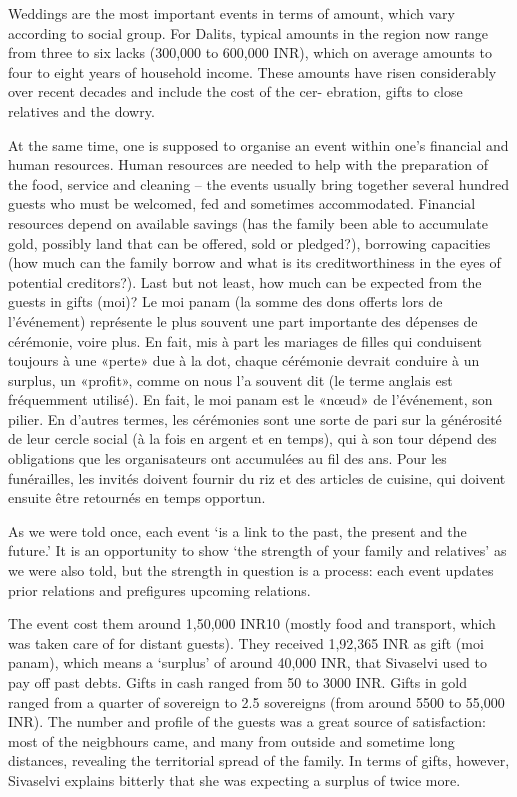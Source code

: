 \documentclass[a4paper, 11pt, onecolumn]{article}
\begin{document}
\cite{Guerin2020c} Weddings are the most important events in terms of amount,
which vary according to social group. For Dalits, typical amounts in the region now range from three
to six lacks (300,000 to 600,000 INR), which on average amounts to four to eight years of household
income. These amounts have risen considerably over recent decades and include the cost of the cer-
ebration, gifts to close relatives and the dowry.

At the same time, one is supposed to organise an event within one’s financial and
human resources. Human resources are needed to help with the preparation of the food, service
and cleaning – the events usually bring together several hundred guests who must be welcomed, fed and sometimes accommodated. Financial resources depend on available savings (has the family
been able to accumulate gold, possibly land that can be offered, sold or pledged?), borrowing
capacities (how much can the family borrow and what is its creditworthiness in the eyes of potential
creditors?). Last but not least, how much can be expected from the guests in gifts (moi)? 
Le moi panam (la somme des dons offerts lors de l'événement) représente le plus souvent une part importante des dépenses de cérémonie, voire plus. En fait, mis à part les mariages de filles qui conduisent toujours à une «perte» due à la dot, chaque cérémonie devrait conduire à un surplus, un «profit», comme on nous l’a souvent dit (le terme anglais est fréquemment utilisé). En fait, le moi panam est le «nœud» de l’événement, son pilier. En d'autres termes, les cérémonies sont une sorte de pari sur la générosité de leur cercle social (à la fois en argent et en temps), qui à son tour dépend des obligations que les organisateurs ont accumulées au fil des ans. Pour les funérailles, les invités doivent fournir du riz et des articles de cuisine, qui doivent ensuite être retournés en temps opportun.

As we were told once, each event ‘is a link
to the past, the present and the future.’ It is an opportunity to show ‘the strength of your family
and relatives’ as we were also told, but the strength in question is a process: each event updates
prior relations and prefigures upcoming relations.


The event cost them around 1,50,000 INR10 (mostly food and transport, which was taken care of
for distant guests). They received 1,92,365 INR as gift (moi panam), which means a ‘surplus’ of
around 40,000 INR, that Sivaselvi used to pay off past debts. Gifts in cash ranged from 50 to 3000
INR. Gifts in gold ranged from a quarter of sovereign to 2.5 sovereigns (from around 5500 to
55,000 INR). The number and profile of the guests was a great source of satisfaction: most of the
neigbhours came, and many from outside and sometime long distances, revealing the territorial
spread of the family. In terms of gifts, however, Sivaselvi explains bitterly that she was expecting
a surplus of twice more.
\end{document}
